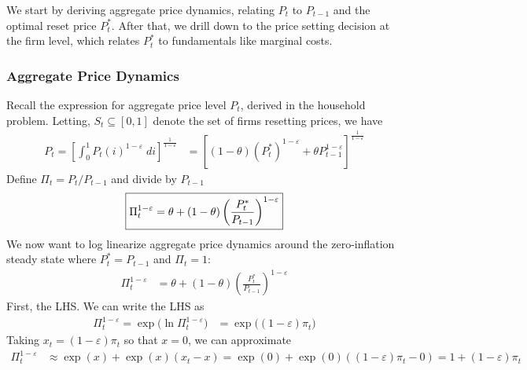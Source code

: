 \documentclass[12pt]{article}
\theoremstyle{plain}
\theoremstyle{definition}
\theoremstyle{remark}
\begin{document}
We start by deriving aggregate price dynamics, relating $P_t$ to
$P_{t-1}$ and the optimal reset price $P_t^*$. After that, we drill down
to the price setting decision at the firm level, which relates $P_t^*$
to fundamentals like marginal costs.


\subsubsection{Aggregate Price Dynamics}

Recall the expression for aggregate price level $P_t$, derived in the
household problem. Letting, $S_t\subseteq[0,1]$ denote the set of firms
resetting prices, we have
\begin{align*}
  P_t
  =
  \left[
    \int_0^1 P_t(i)^{1-\varepsilon}\;di
  \right]^{\frac{1}{1-\varepsilon}}
  &= \left[
    (1-\theta) (P_t^*)^{1-\varepsilon}
    +
    \theta P_{t-1}^{1-\varepsilon}
  \right]^{\frac{1}{1-\varepsilon}}
\end{align*}
Define $\Pi_t=P_t/P_{t-1}$ and divide by $P_{t-1}$
\begin{align*}
  \boxed{%
  \Pi_t^{1-\varepsilon}
  =
    \theta
    +
    (1-\theta)
    \left(\frac{P_t^*}{P_{t-1}}\right)^{1-\varepsilon}
  }
\end{align*}
We now want to log linearize aggregate price dynamics around the
zero-inflation steady state where $P_t^*=P_{t-1}$ and $\Pi_t=1$:
\begin{align}
  \Pi_t^{1-\varepsilon}
  &=
    \theta
    +
    (1-\theta)
    \left(\frac{P_t^*}{P_{t-1}}\right)^{1-\varepsilon}
  \label{calvoagg}
\end{align}
First, the LHS. We can write the LHS as
\begin{align*}
  \Pi_t^{1-\varepsilon}
  = \exp\big(\ln \Pi_t^{1-\varepsilon}\big)
  &= \exp\big(
    (1-\varepsilon)\pi_t
  \big)
\end{align*}
Taking $x_t=(1-\varepsilon)\pi_t$ so that $x=0$, we can
approximate
\begin{align*}
  \Pi_t^{1-\varepsilon}
  &\approx
  \exp(x) + \exp(x)(x_t-x)
  = \exp(0) + \exp(0)((1-\varepsilon)\pi_t-0)
  = 1+ (1-\varepsilon)\pi_t
\end{align*}
\end{document}
